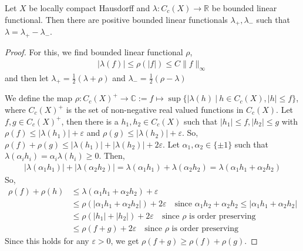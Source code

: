 

\begin{lemma}
  Let $X$ be locally compact Hausdorff and $\lambda: C_c(X) \to
  \mathbb{R}$ be bounded linear functional. Then there are positive
  bounded linear functionals $\lambda_+, \lambda_-$ such that
  $\lambda = \lambda_+ - \lambda_-$.
\end{lemma}
\begin{proof}
  For this, we find bounded linear functional $\rho$,
  \begin{align*}
    |\lambda(f)| \le \rho(|f|) \le C \| f\|_\infty
  \end{align*}
  and then let $\lambda_+ = \frac{1}{2}(\lambda + \rho)$ and
  $\lambda_- = \frac{1}{2}(\rho - \lambda)$

  We define the map $\rho :   C_c(X)^+ \to  \mathbb{C} := f \mapsto
  \sup \{ |\lambda(h) \ | \ h \in C_c(X), |h| \le f \}$, where
  $C_c(X)^+$ is the set of non-negative real valued functions in $C_c(X)$.
  Let $ f, g \in C_c(X)^+$, then there is a $ h_1, h_2 \in C_c(X)$
  such that $|h_1| \le f, |h_2| \le g$ with $\rho(f) \le |
  \lambda(h_1)| + \varepsilon$ and $\rho(g) \le |\lambda(h_2)| + \varepsilon$.
  So, $\rho(f) + \rho(g) \le |\lambda(h_1)| + |\lambda(h_2)| + 2 \varepsilon$.
  Let $\alpha_1, \alpha_2 \in \{ \pm 1 \}$ such that
  $\lambda(\alpha_i h_i) = \alpha_i \lambda(h_i) \ge 0$. Then,
  \begin{align*}
    |\lambda(\alpha_1h_1)| + |\lambda( \alpha_2 h_2)| =
    \lambda(\alpha_1 h_1) + \lambda(\alpha_2 h_2)  =
    \lambda(\alpha_1 h_1 + \alpha_2 h_2)
  \end{align*}
  So,
  \begin{align*}
    \rho(f) + \rho(h) & \le \lambda(\alpha_1 h_1 + \alpha_2 h_2) +
    \varepsilon \\
    & \le \rho(|\alpha_1h_1 + \alpha_2 h_2|) + 2 \varepsilon  \quad
    \textrm{since } \alpha_1h_2 +
    \alpha_2 h_2 \le |\alpha_1h_1 + \alpha_2h_2|\\
    & \le \rho(|h_1| + |h_2|) + 2 \varepsilon \quad \textrm{since }
    \rho \textrm{ is order preserving} \\
    & \le \rho(f + g) + 2 \varepsilon \quad \textrm{since }
    \rho \textrm{ is order preserving}
  \end{align*}
  Since this holds for any $\varepsilon > 0$, we get $\rho(f + g) \ge
  \rho(f) + \rho(g)$.


\end{proof}
